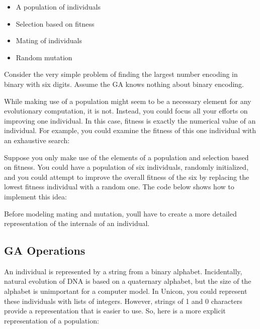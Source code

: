 \begin{itemize}
\item A population of individuals
\item Selection based on fitness
\item Mating of individuals
\item Random mutation
\end{itemize}
Consider the very simple problem of finding the largest number encoding
in binary with six digits. Assume the GA knows nothing about binary
encoding.

While making use of a population might seem to be a necessary element
for any evolutionary computation, it is not. Instead, you could focus
all your efforts on improving one individual. In this case, fitness is
exactly the numerical value of an individual. For example, you could
examine the fitness of this one individual with an exhaustive search:


Suppose you only make use of the elements of a population and selection
based on fitness. You could have a population of six individuals,
randomly initialized, and you could attempt to improve the overall
fitness of the six by replacing the lowest fitness individual with a
random one. The code below shows how to implement this idea:


Before modeling mating and mutation, you{\textquotesingle}ll have to
create a more detailed representation of the internals of an
individual.

\subsection{GA Operations}
An individual is represented by a string from a binary alphabet.
Incidentally, natural evolution of DNA is based on a quaternary
alphabet, but the size of the alphabet is unimportant for a computer
model. In Unicon, you could represent these individuals with lists of
integers. However, strings of \textsf{{\textquotedbl}1{\textquotedbl}}
and \textsf{{\textquotedbl}0{\textquotedbl}} characters provide a
representation that is easier to use. So, here is a more explicit
representation of a population:

